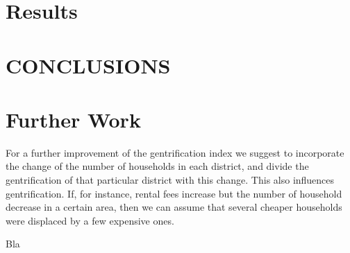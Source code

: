 \documentclass[a4paper, 10pt, conference]{ieeeconf}      %
\begin{document}
\section{Results}
\label{sec:Results}


\section{CONCLUSIONS}
\label{sec:conclusion}

\section{Further Work}
For a further improvement of the gentrification index we suggest to incorporate the change of the number of households in each district, and divide the gentrification of that particular district with this change. This also influences gentrification. If, for instance, rental fees increase but the number of household decrease in a certain area, then we can assume that several cheaper households were displaced by a few expensive ones. 


Bla

\addtolength{\textheight}{-12cm}   %




\end{document}
